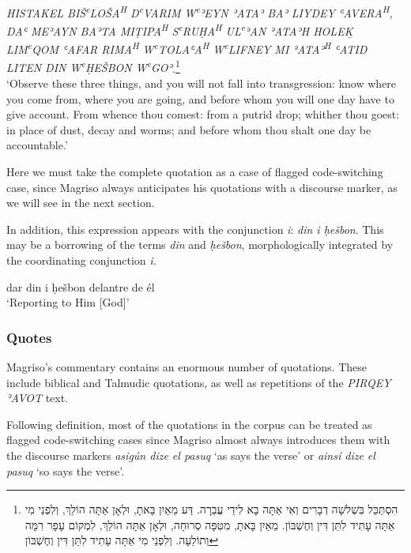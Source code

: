 \documentclass[output=paper,colorlinks,citecolor=brown,babel,arabicfont]{langscibook}
\begin{document}
\ea\label{ch3.7.ex.n6}
\textit{HISTAKEL BIŠ\textsuperscript{e}LOŠA\textsuperscript{H} D\textsuperscript{e}VARIM W\textsuperscript{e}ʾEYN ʾATAʾ BAʾ LIYDEY ʿAVERA\textsuperscript{H}, DAʿ MEʾAYN BAʾTA MIṬIPA\textsuperscript{H} S\textsuperscript{e}RUḤA\textsuperscript{H} UL\textsuperscript{e}ʾAN ʾATAʾH HOLE\b{K} LIM\textsuperscript{e}QOM ʿAFAR RIMA\textsuperscript{H} W\textsuperscript{e}TOLAʿA\textsuperscript{H} W\textsuperscript{e}LIFNEY MI ʾATAʾ\textsuperscript{H} ʿATID LITEN DIN W\textsuperscript{e}ḤEŠBON W\textsuperscript{e}GOʾ}.\footnote{\texthebrew{הִסְתַּכֵּל בִּשְׁלשָׁה דְבָרִים וְאִי אַתָּה בָא לִידֵי עֲבֵרָה. דַּע מֵאַיִן בָּאתָ, וּלְאָן אַתָּה הוֹלֵךְ, וְלִפְנֵי מִי אַתָּה עָתִיד לִתֵּן דִּין וְחֶשְׁבּוֹן. מֵאַיִן בָּאתָ, מִטִּפָּה סְרוּחָה, וּלְאָן אַתָּה הוֹלֵךְ, לִמְקוֹם עָפָר רִמָּה וְתוֹלֵעָה. וְלִפְנֵי מִי אַתָּה עָתִיד לִתֵּן דִּין וְחֶשְׁבּוֹן}} \\
`Observe these three things, and you will not fall into transgression: know where you come from, where you are going, and before whom you will one day have to give account. From whence thou comest: from a putrid drop; whither thou goest: in place of dust, decay and worms; and before whom thou shalt one day be accountable.'
\z

Here we must take the complete quotation as a case of flagged code-switching case, since Magriso always anticipates his quotations with a discourse marker, as we will see in the next section.  

In addition, this expression appears with the  conjunction \textit{i}: \textit{din i ḥešbon}. This may be a borrowing of the terms \textit{din} and \textit{ḥešbon}, morphologically integrated by the coordinating conjunction \textit{i}. 

\ea\label{ch3.7.ex.n7}
dar {din i ḥešbon delantre de él} \\
`Reporting to Him [God]'
\z

\subsubsection{Quotes}\label{ch3.7.ss.3.2.2}


Magriso's commentary contains an enormous number of quotations. These include biblical and Talmudic quotations, as well as repetitions of the \textit{PIRQEY ʾAVOT} text.  


Following \citet[1176]{poplack_sankoff1988} definition, most of the quotations in the corpus can be treated as flagged code-switching cases since Magriso almost always introduces them with the discourse markers \textit{asigún dize el pasuq} `as says the verse' or \textit{ainsí dize el pasuq} `so says the verse'. 
\end{document}
